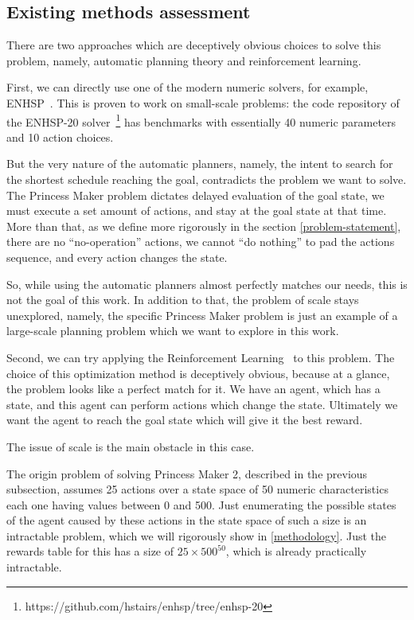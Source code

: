 \documentclass[11pt, a4paper]{article}
\begin{document}
	\subsection{Existing methods assessment}\label{introduction:assessment}

	There are two approaches which are deceptively obvious choices to solve this problem, namely, automatic planning theory and reinforcement learning.
	
	First, we can directly use one of the modern numeric solvers, for example, ENHSP~\cite{scala2020subgoaling}.
	This is proven to work on small-scale problems: the code repository of the ENHSP-20 solver~\footnote{https://github.com/hstairs/enhsp/tree/enhsp-20} has benchmarks with essentially 40 numeric parameters and 10 action choices.
	
	But the very nature of the automatic planners, namely, the intent to search for the shortest schedule reaching the goal, contradicts the problem we want to solve.
	The Princess Maker problem dictates delayed evaluation of the goal state, we must execute a set amount of actions, and stay at the goal state at that time.
	More than that, as we define more rigorously in the section \ref{problem-statement}, there are no ``no-operation'' actions, we cannot ``do nothing'' to pad the actions sequence, and every action changes the state.
	
	So, while using the automatic planners almost perfectly matches our needs, this is not the goal of this work.
	In addition to that, the problem of scale stays unexplored, namely, the specific Princess Maker problem is just an example of a large-scale planning problem which we want to explore in this work.

	Second, we can try applying the Reinforcement Learning~\cite{sutton2018reinforcement} to this problem.
	The choice of this optimization method is deceptively obvious, because at a glance, the problem looks like a perfect match for it.
	We have an agent, which has a state, and this agent can perform actions which change the state.
	Ultimately we want the agent to reach the goal state which will give it the best reward.
	
	The issue of scale is the main obstacle in this case.

	The origin problem of solving Princess Maker 2, described in the previous subsection,  assumes 25 actions over a state space of 50 numeric characteristics each one having values between 0 and 500.
	Just enumerating the possible states of the agent caused by these actions in the state space of such a size is an intractable problem, which we will rigorously show in \ref{methodology}.
	Just the rewards table for this has a size of $25 \times 500^{50}$, which is already practically intractable.
	
\end{document}
